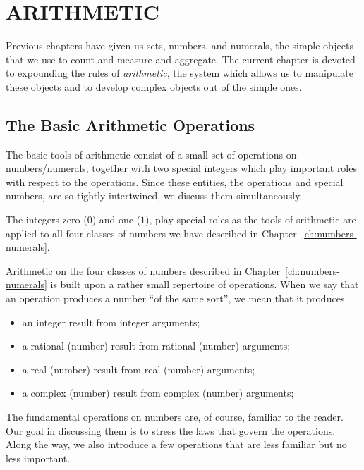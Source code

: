 
\chapter{ARITHMETIC}
\label{ch:arithmetic}

Previous chapters have given us sets, numbers, and numerals, the
simple objects that we use to count and measure and aggregate.  The
current chapter is devoted to expounding the rules of {\em
  arithmetic}, the system which allows us to manipulate these objects
and to develop complex objects out of the simple ones.

\section{The Basic Arithmetic Operations}
\label{sec:Arithmetic-Tools}

The basic tools of arithmetic consist of a small set of operations on
numbers/numerals, together with two special integers which play
important roles with respect to the operations.  Since these entities,
the operations and special numbers, are so tightly intertwined, we
discuss them simultaneously.

\smallskip

The integers zero ($0$)
and one ($1$),
play special roles as the tools of srithmetic are applied to all four
classes of numbers we have described in
Chapter~\ref{ch:numbers-numerals}.

\smallskip

%
Arithmetic on the four classes of numbers described in
Chapter~\ref{ch:numbers-numerals} is built upon a rather small
repertoire of operations.  When we say that an operation produces a
number ``of the same sort'', we mean that it produces
\begin{itemize}
\item
an integer result from integer arguments;
\item
a rational (number) result from rational (number) arguments;
\item
a real (number) result from real (number) arguments;
\item
a complex (number) result from complex (number) arguments;
\end{itemize}
The fundamental operations on numbers are, of course, familiar to the
reader.  Our goal in discussing them is to stress the laws that govern
the operations.  Along the way, we also introduce a few operations
that are less familiar but no less important.

